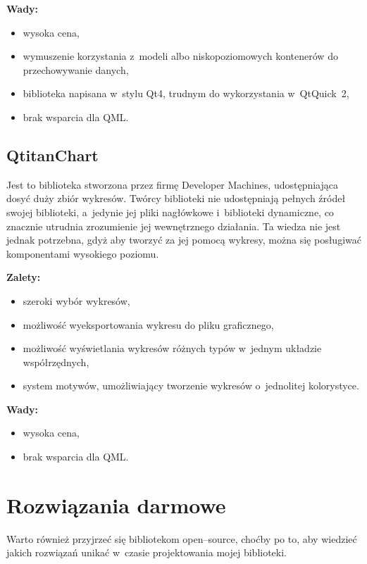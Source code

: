 \textbf{Wady:}
\begin{itemize}
\item{wysoka cena,}
\item{wymuszenie korzystania z~modeli albo niskopoziomowych kontenerów do przechowywanie danych,}
\item{biblioteka napisana w~stylu Qt4, trudnym do wykorzystania w~QtQuick~2,}
\item{brak wsparcia dla QML.}
\end{itemize}

\subsection{QtitanChart}
Jest to biblioteka stworzona przez firmę Developer Machines, udostępniająca dosyć duży zbiór wykresów. Twórcy biblioteki nie udostępniają pełnych źródeł swojej biblioteki, a~jedynie jej pliki nagłówkowe i~biblioteki dynamiczne, co znacznie utrudnia zrozumienie jej wewnętrznego działania. Ta wiedza nie jest jednak potrzebna, gdyż aby tworzyć za jej pomocą wykresy, można się posługiwać komponentami wysokiego poziomu.\newline

\textbf{Zalety:}
\begin{itemize}
\item{szeroki wybór wykresów,}
\item{możliwość wyeksportowania wykresu do pliku graficznego,}
\item{możliwość wyświetlania wykresów różnych typów w~jednym układzie współrzędnych,}
\item{system motywów, umożliwiający tworzenie wykresów o~jednolitej kolorystyce.}\newline
\end{itemize}

\textbf{Wady:}
\begin{itemize}
\item{wysoka cena,}
\item{brak wsparcia dla QML.}
\end{itemize}


\section{Rozwiązania darmowe}
Warto również przyjrzeć się bibliotekom open--source, choćby po to, aby wiedzieć jakich rozwiązań unikać w~czasie projektowania mojej biblioteki.

